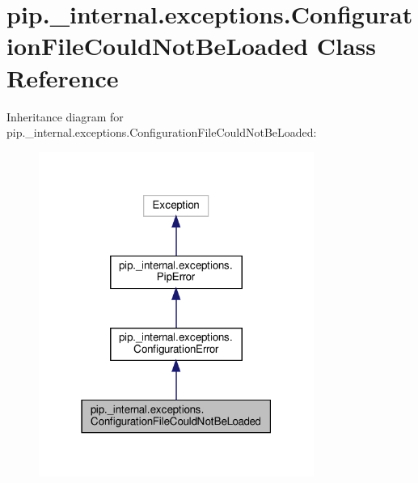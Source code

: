 \hypertarget{classpip_1_1__internal_1_1exceptions_1_1ConfigurationFileCouldNotBeLoaded}{}\section{pip.\+\_\+internal.\+exceptions.\+Configuration\+File\+Could\+Not\+Be\+Loaded Class Reference}
\label{classpip_1_1__internal_1_1exceptions_1_1ConfigurationFileCouldNotBeLoaded}


Inheritance diagram for pip.\+\_\+internal.\+exceptions.\+Configuration\+File\+Could\+Not\+Be\+Loaded\+:
\nopagebreak
\begin{figure}[H]
\begin{center}
\leavevmode
\includegraphics[width=255pt]{classpip_1_1__internal_1_1exceptions_1_1ConfigurationFileCouldNotBeLoaded__inherit__graph}
\end{center}
\end{figure}


